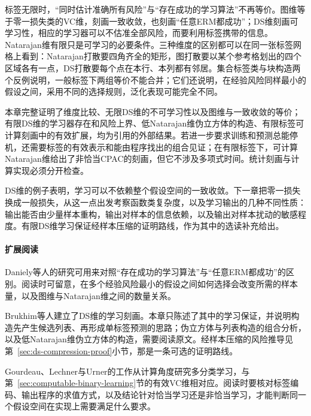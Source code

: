 标签无限时，“同时估计准确所有风险”与“存在成功的学习算法”不再等价。图维等于零一损失类的VC维，刻画一致收敛，也刻画“任意ERM都成功”；DS维刻画可学习性，相应的学习器可以不估准全部风险，而要利用标签携带的信息。Natarajan维有限只是可学习的必要条件。三种维度的区别都可以在同一张标签网格上看到：Natarajan打散要四角齐全的矩形，图打散要以某个参考格划出的四个区域各有一点，DS打散要每个点在本行、本列都有邻居。集合标签类与块构造两个反例说明，一般标签下两组等价不能合并；它们还说明，在经验风险同样最小的假设之间，采用不同的选择规则，泛化表现可能完全不同。

本章完整证明了维度比较、无限DS维的不可学习性以及图维与一致收敛的等价；有限DS维的学习器存在和风险上界、低Natarajan维伪立方体的构造、有限标签可计算刻画中的有效扩展，均为引用的外部结果。若进一步要求训练和预测总能停机，还需要标签的有效表示和能由程序找出的组合见证；在有限标签下，可计算Natarajan维给出了非恰当CPAC的刻画，但它不涉及多项式时间。统计刻画与计算实现必须分开检查。

DS维的例子表明，学习可以不依赖整个假设空间的一致收敛。下一章把零一损失换成一般损失，从这一点出发考察函数类复杂度，以及学习输出的几种不同性质：输出能否由少量样本重构，输出对样本的信息依赖，以及输出对样本扰动的敏感程度。有限DS维学习保证经样本压缩的证明路线，作为其中的选读补充给出。

\paragraph{扩展阅读}
Daniely等人的研究可用来对照“存在成功的学习算法”与“任意ERM都成功”的区别。阅读时可留意，在多个经验风险最小的假设之间如何选择会改变所需的样本量，以及图维与Natarajan维之间的数量关系。

Brukhim等人建立了DS维的学习刻画。本章只陈述了其中的学习保证，并说明构造先产生候选列表、再形成单标签预测的思路；伪立方体与列表构造的组合分析，以及低Natarajan维伪立方体的构造，需要阅读原文。经样本压缩的风险推导见第~\ref{sec:ds-compression-proof}小节，那是一条可选的证明路线。

Gourdeau、Lechner与Urner的工作从计算角度研究多分类学习，与第~\ref{sec:computable-binary-learning}节的有效VC维相对应。阅读时要核对标签编码、输出程序的求值方式，以及结论针对恰当学习还是非恰当学习，才能判断同一个假设空间在实现上需要满足什么要求。
